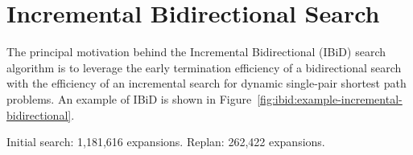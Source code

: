 
\section{Incremental Bidirectional Search}
\label{sef:ibid:ibid}

The principal motivation behind
the Incremental Bidirectional (IBiD) search algorithm
is to leverage the early termination efficiency of a bidirectional search
with the efficiency of an incremental search for dynamic
single-pair shortest path problems.
An example of IBiD is shown in
Figure~\ref{fig:ibid:example-incremental-bidirectional}.
\begin{marginfigure}%
   \centering%
   
   \caption{Initial search: 1,181,616 expansions.
      Replan: 262,422 expansions.}%
   \label{fig:ibid:example-incremental-bidirectional}%
\end{marginfigure}

